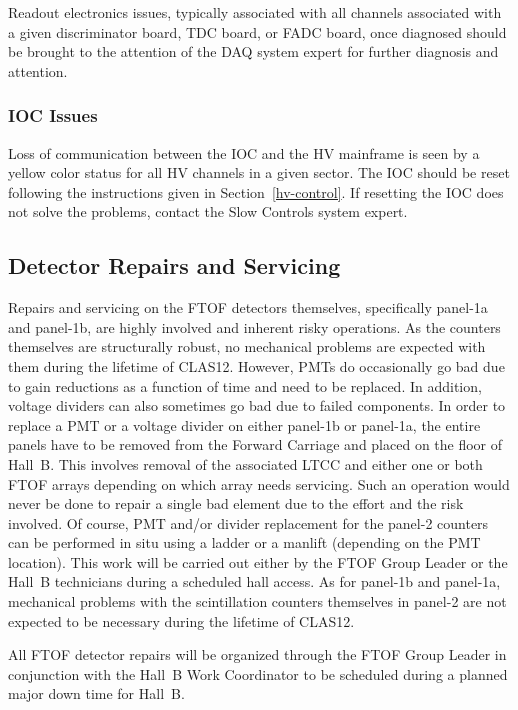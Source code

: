 \documentclass[letterpaper,10pt]{article}
\begin{document}
Readout electronics issues, typically associated with all channels associated with a given
discriminator board, TDC board, or FADC board, once diagnosed should be brought to the
attention of the DAQ system expert for further diagnosis and attention.

\subsubsection{IOC Issues}
\label{ioc-issues}

Loss of communication between the IOC and the HV mainframe is seen by a yellow color status for
all HV channels in a given sector. The IOC should be reset following the instructions given in
Section~\ref{hv-control}. If resetting the IOC does not solve the problems, contact the 
Slow Controls system expert.

\subsection{Detector Repairs and Servicing}

Repairs and servicing on the FTOF detectors themselves, specifically panel-1a and panel-1b, are 
highly involved and inherent risky operations. As the counters themselves are structurally robust, 
no mechanical problems are expected with them during the lifetime of CLAS12. However, PMTs do 
occasionally go bad due to gain reductions as a function of time and need to be replaced. In addition, 
voltage dividers can also sometimes go bad due to failed components. In order to replace a PMT or a 
voltage divider on either panel-1b or panel-1a, the entire panels have to be removed from the Forward 
Carriage and placed on the floor of Hall~B. This involves removal of the associated LTCC and either 
one or both FTOF arrays depending on which array needs servicing. Such an operation would never be 
done to repair a single bad element due to the effort and the risk involved. Of course, PMT and/or 
divider replacement for the panel-2 counters can be performed in situ using a ladder or a manlift 
(depending on the PMT location). This work will be carried out either by the FTOF Group Leader or 
the Hall~B technicians during a scheduled hall access. As for panel-1b and panel-1a, mechanical 
problems with the scintillation counters themselves in panel-2 are not expected to be necessary 
during the lifetime of CLAS12.

All FTOF detector repairs will be organized through the FTOF Group Leader in conjunction with the
Hall~B Work Coordinator to be scheduled during a planned major down time for Hall~B.
\end{document}
